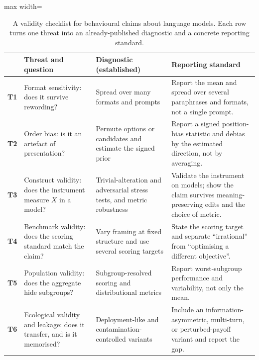 \documentclass[11pt]{article}
\begin{document}
\begin{table}[t]
\centering
\small
\renewcommand{\arraystretch}{1.15}
\begin{adjustbox}{max width=\textwidth}
\begin{tabular}{@{}p{0.5cm}p{3.2cm}p{5.1cm}p{5.6cm}@{}}
\toprule
& \textbf{Threat and question} & \textbf{Diagnostic (established)} & \textbf{Reporting standard} \\
\midrule
\textbf{T1} & Format sensitivity: does it survive rewording? & Spread over many formats and prompts \cite{sclar2024quantifying,mizrahi2024state} & Report the mean and spread over several paraphrases and formats, not a single prompt. \\
\textbf{T2} & Order bias: is it an artefact of presentation? & Permute options or candidates and estimate the signed prior \cite{zheng2024selectors,dominguez2024questioning} & Report a signed position-bias statistic and debias by the estimated direction, not by averaging. \\
\textbf{T3} & Construct validity: does the instrument measure $X$ in a model? & Trivial-alteration and adversarial stress tests, and metric robustness \cite{ullman2023trivial,shapira2024clever,schaeffer2023mirage} & Validate the instrument on models; show the claim survives meaning-preserving edits and the choice of metric. \\
\textbf{T4} & Benchmark validity: does the scoring standard match the claim? & Vary framing at fixed structure and use several scoring targets \cite{lore2024strategic,duan2024gtbench} & State the scoring target and separate ``irrational'' from ``optimising a different objective''. \\
\textbf{T5} & Population validity: does the aggregate hide subgroups? & Subgroup-resolved scoring and distributional metrics \cite{santurkar2023whose,hucollier2024persona} & Report worst-subgroup performance and variability, not only the mean. \\
\textbf{T6} & Ecological validity and leakage: does it transfer, and is it memorised? & Deployment-like and contamination-controlled variants \cite{liu2024autonomous,tewolde2026coopeval} & Include an information-asymmetric, multi-turn, or perturbed-payoff variant and report the gap. \\
\bottomrule
\end{tabular}
\end{adjustbox}
\caption{A validity checklist for behavioural claims about language models.
Each row turns one threat into an already-published diagnostic and a concrete
reporting standard.}
\label{tab:checklist}
\end{table}
\end{document}

